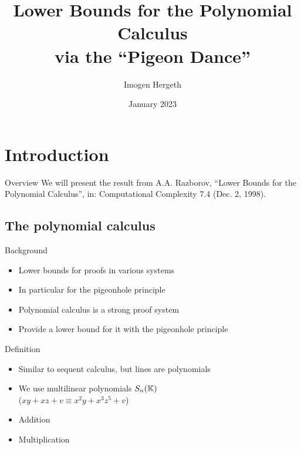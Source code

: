 \documentclass[xcolor={dvipsnames}, aspectratio=169]{beamer}
\title{Lower Bounds for the Polynomial Calculus\\via the ``Pigeon Dance''}
\author{Imogen Hergeth}
\date{January 2023}
\newcommand{\Sn}{S_n(\KK)}
\begin{document}
\maketitle

\section{Introduction}

\begin{frame}{Overview}
    We will present the result from A.A. Razborov, ``Lower Bounds for the Polynomial Calculus'',
    in: Computational Complexity 7.4 (Dec. 2, 1998).

    \tableofcontents[hideallsubsections]
\end{frame}

\subsection{The polynomial calculus}

\begin{frame}{Background}
    \begin{itemize}[<+->]
        \item Lower bounds for proofs in various systems
        \item In particular for the pigeonhole principle
        \item Polynomial calculus is a strong proof system
        \item Provide a lower bound for it with the pigeonhole principle
    \end{itemize}
\end{frame}

\begin{frame}{Definition}
    \begin{itemize}[<+->]
        \item Similar to sequent calculus, but lines are polynomials
        \item We use multilinear polynomials $\Sn$\\
            ($xy + xz + v \equiv x^2y + x^3z^5 + v$)
        \item Addition
        \begin{prooftree}
        \end{prooftree}
        \item Multiplication
        \begin{prooftree}
        \end{prooftree}
    \end{itemize}
\end{frame}
\end{document}
